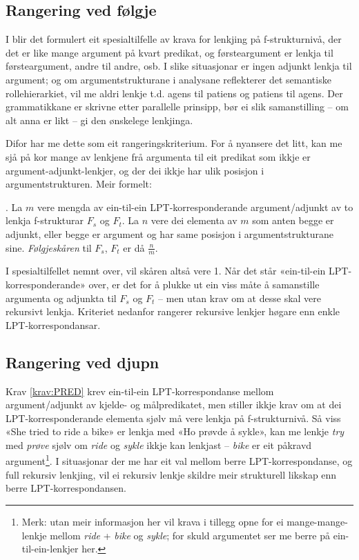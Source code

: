 \documentclass[11pt,a4paper,oneside,draft]{report}
\begin{document}
\subsection{Rangering ved følgje}
\label{sec-3.8.1}

I \citet[s.~75--76]{dyvik2009lmp} blir det formulert eit
spesialtilfelle av krava for lenkjing på f-strukturnivå, der det er
like mange argument på kvart predikat, og førsteargument er lenkja til
førsteargument, andre til andre, osb. I slike situasjonar er ingen
adjunkt lenkja til argument; og om argumentstrukturane i analysane
reflekterer det semantiske rollehierarkiet, vil me aldri lenkje
t.d. agens til patiens og patiens til agens. Der grammatikkane er
skrivne etter parallelle prinsipp, bør ei slik samanstilling -- om alt
anna er likt -- gi den ønskelege lenkjinga.

Difor har me dette som eit rangeringskriterium. For å nyansere det
litt, kan me sjå på kor mange av lenkjene frå argumenta til eit
predikat som ikkje er argument-adjunkt-lenkjer, og der dei ikkje har
ulik posisjon i argumentstrukturen. Meir formelt:

\ex. \label{krav:arg-order-rate} La $m$ vere mengda av ein-til-ein
     LPT-korresponderande argument/adjunkt av to lenkja f-strukturar
     $F_s$ og $F_t$. La $n$ vere dei elementa av $m$ som anten begge
     er adjunkt, eller begge er argument og har same posisjon i
     argumentstrukturane sine. \emph{Følgjeskåren} til $F_s$, $F_t$ er då
     $\frac{n}{m}$.

I spesialtilfellet nemnt over, vil skåren altså vere 1. Når det står
«ein-til-ein LPT-korresponderande» over, er det for å plukke ut ein
viss måte å samanstille argumenta og adjunkta til $F_s$ og $F_t$ --
men utan krav om at desse skal vere rekursivt lenkja. Kriteriet
nedanfor rangerer rekursive lenkjer høgare enn enkle
LPT-korrespondansar.

\subsection{Rangering ved djupn}
\label{sec-3.8.2}

Krav \ref{krav:PRED} krev ein-til-ein LPT-korrespondanse mellom
argument/adjunkt av kjelde- og målpredikatet, men stiller ikkje krav
om at dei LPT-korresponderande elementa sjølv må vere lenkja på
f-strukturnivå. Så viss «She tried to ride a bike» er lenkja med «Ho
prøvde å sykle», kan me lenkje \emph{try} med \emph{prøve} sjølv om \emph{ride} og
\emph{sykle} ikkje kan lenkjast -- \emph{bike} er eit påkravd argument\footnote{Merk: utan meir informasjon her vil krava i tillegg opne for
        ei mange-mange-lenkje mellom \emph{ride} + \emph{bike} og \emph{sykle}; for
        skuld argumentet ser me berre på ein-til-ein-lenkjer her. }. I
situasjonar der me har eit val mellom berre LPT-korrespondanse, og
full rekursiv lenkjing, vil ei rekursiv lenkje skildre meir
strukturell likskap enn berre LPT-korrespondansen.
\end{document}

